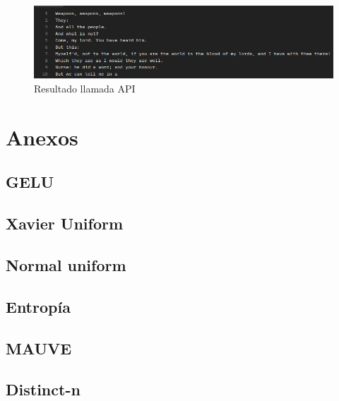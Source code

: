 \documentclass[11pt]{book}
\newcommand{\clearemptydoublepage}{\newpage{\pagestyle{empty}\cleardoublepage}}
\begin{document}
\begin{figure}[h]
    \centering
    \includegraphics[width=0.5\linewidth]{img/api_res.png}
    \caption{Resultado llamada API}
    \label{fig:placeholder28}
\end{figure}

\clearemptydoublepage

\printbibliography[title={Referencias Bibliográficas}]

\appendix 
\chapter{Anexos}

\section{GELU} \label{sec:gelu}
\section{Xavier Uniform} \label{sec:xavier}
\section{Normal uniform} \label{sec:normal}

\section{Entropía} \label{sec:entropia}

\section{MAUVE} \label{sec:mauve}


\section{Distinct-n} \label{sec:distinct-n}


\clearemptydoublepage
\end{document}
